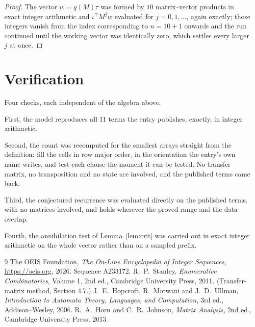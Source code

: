 \documentclass[11pt,a4paper]{article}
\theoremstyle{plain}
\theoremstyle{definition}
\begin{document}
\begin{proof}
The vector $w=q(M)\tau$ was formed by $10$ matrix--vector products in exact integer
arithmetic and $\iota^{\!\top}M^{j}w$ evaluated for $j=0,1,\dots$, again exactly; those
integers vanish from the index corresponding to $n=10+1$ onwards and the run continued
until the working vector was identically zero, which settles every larger $j$ at once.
\end{proof}

\section{Verification}

Four checks, each independent of the algebra above.

First, the model reproduces all $11$ terms the entry publishes, exactly, in integer
arithmetic.

Second, the count was recomputed for the smallest arrays straight from the definition: fill the
cells in row major order, in the orientation the entry's own name writes, and test each clause
the moment it can be tested. No transfer matrix, no transposition and no state are involved,
and the published terms came back.

Third, the conjectured recurrence was evaluated directly on the published terms, with no
matrices involved, and holds wherever the proved range and the data overlap.

Fourth, the annihilation test of Lemma~\ref{lem:crit} was carried out in exact integer
arithmetic on the whole vector rather than on a sampled prefix.

\begin{thebibliography}{9}
 The OEIS Foundation, \emph{The On-Line Encyclopedia of Integer
Sequences}, \url{https://oeis.org}, 2026. Sequence A233172.
 R.~P.~Stanley, \emph{Enumerative Combinatorics}, Volume 1, 2nd ed.,
Cambridge University Press, 2011. (Transfer-matrix method, Section 4.7.)
 J.~E.~Hopcroft, R.~Motwani and J.~D.~Ullman, \emph{Introduction to Automata
Theory, Languages, and Computation}, 3rd ed., Addison--Wesley, 2006.
 R.~A.~Horn and C.~R.~Johnson, \emph{Matrix Analysis}, 2nd ed., Cambridge
University Press, 2013.
\end{thebibliography}
\end{document}
